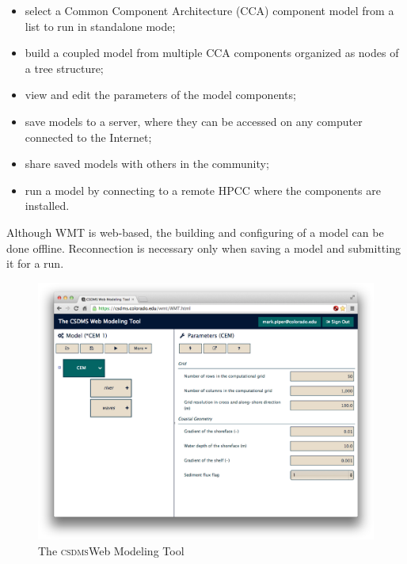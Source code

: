 \documentclass[11pt, oneside]{amsart}
\DeclareRobustCommand{\csdms}{\textsc{csdms}}
\begin{document}
\begin{itemize}

\item select a Common Component Architecture (CCA) component model
      from a list to run in standalone mode;

\item build a coupled model from multiple CCA components organized as nodes
      of a tree structure;

\item  view and edit the parameters of the model components;

\item save models to a server, where they can be accessed on any computer
      connected to the Internet;

\item share saved models with others in the community;

\item run a model by connecting to a remote HPCC where the components are
      installed.

\end{itemize}

Although WMT is web-based, the building and configuring of a model can be done
offline. Reconnection is necessary only when saving a model and submitting it
for a run.

\begin{figure}
  \caption{The \csdms Web Modeling Tool}
  \begin{center}
    \includegraphics[scale=.25]{wmt.eps}
  \end{center}
  \label{fig:wmt_screenshot}
\end{figure}
\end{document}
